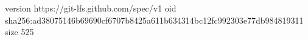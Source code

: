 version https://git-lfs.github.com/spec/v1
oid sha256:ad38075146b69690cf6707b8425a611b634314bc12fc992303e77db984819311
size 525
